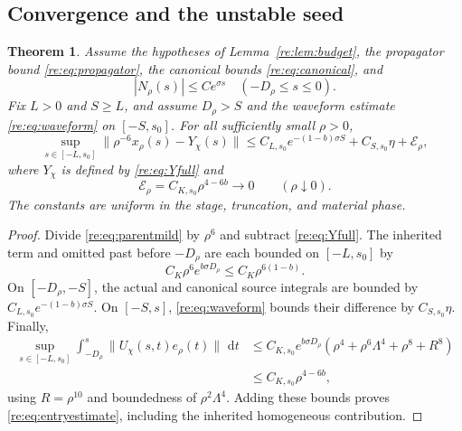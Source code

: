 \documentclass[11pt]{amsart}
\newtheorem{theorem}{Theorem}[section]
\theoremstyle{remark}
\numberwithin{equation}{section}
\newcommand{\dd}{\,\mathrm d}
\begin{document}
\subsection{Convergence and the unstable seed}
\begin{theorem}
\label{re:thm:entry}
Assume the hypotheses of Lemma~\ref{re:lem:budget}, the propagator
bound \eqref{re:eq:propagator}, the canonical bounds
\eqref{re:eq:canonical}, and
\[
 |N_\rho(s)|\le Ce^{\sigma s}\quad(-D_\rho\le s\le0).
\]
Fix $L>0$ and $S\ge L$, and assume $D_\rho>S$ and the waveform
estimate \eqref{re:eq:waveform} on $[-S,s_0]$.
For all sufficiently small $\rho>0$,
\begin{equation}\label{re:eq:entryestimate}
 \sup_{s\in[-L,s_0]}
       \|\rho^{-6}x_\rho(s)-Y_\chi(s)\|
 \le C_{L,s_0}e^{-(1-b)\sigma S}
             +C_{S,s_0}\eta+\mathcal E_\rho,
\end{equation}
where $Y_\chi$ is defined by \eqref{re:eq:Yfull} and
\begin{equation}\label{re:eq:E}
 \mathcal E_\rho=C_{K,s_0}\rho^{4-6b}\longrightarrow0
       \qquad(\rho\downarrow0).
\end{equation}
The constants are uniform in the stage, truncation, and material phase.
\end{theorem}
\begin{proof}
Divide \eqref{re:eq:parentmild} by $\rho^6$ and subtract
\eqref{re:eq:Yfull}. The inherited term and omitted past before
$-D_\rho$ are each bounded on $[-L,s_0]$ by
\[
 C_K\rho^6e^{b\sigma D_\rho}
       \le C_K\rho^{6(1-b)}.
\]
On $[-D_\rho,-S]$, the actual and canonical source integrals
are bounded by $C_{L,s_0}e^{-(1-b)\sigma S}$.
On $[-S,s]$, \eqref{re:eq:waveform} bounds their difference by
$C_{S,s_0}\eta$. Finally,
\[
 \begin{split}
 \sup_{s\in[-L,s_0]}
 \int_{-D_\rho}^s\|U_\chi(s,t)e_\rho(t)\|\,\dd t
 &\le C_{K,s_0}e^{b\sigma D_\rho}
       (\rho^4+\rho^6\Lambda^4+\rho^8+R^8)\\
 &\le C_{K,s_0}\rho^{4-6b},
 \end{split}
\]
using $R=\rho^{10}$ and boundedness of $\rho^2\Lambda^4$.
Adding these bounds proves \eqref{re:eq:entryestimate}, including
the inherited homogeneous contribution.
\end{proof}
\end{document}
